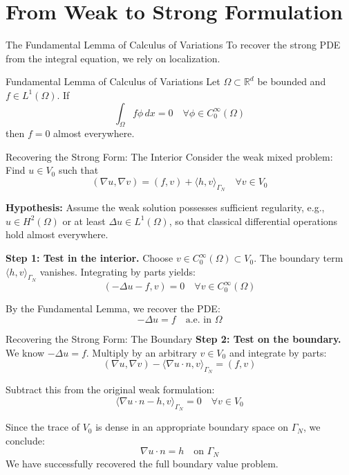 \documentclass[aspectratio=169]{beamer}
\begin{document}
\section{From Weak to Strong Formulation}

\begin{frame}{The Fundamental Lemma of Calculus of Variations}
    To recover the strong PDE from the integral equation, we rely on localization.

    \begin{block}{Fundamental Lemma of Calculus of Variations}
        Let $\Omega \subset \mathbb{R}^d$ be bounded and $f \in L^1(\Omega)$. If
        $$ \int_\Omega f \phi \, dx = 0 \quad \forall \phi \in C_0^\infty(\Omega) $$
        then $f = 0$ almost everywhere.
    \end{block}
\end{frame}

\begin{frame}{Recovering the Strong Form: The Interior}
    Consider the weak mixed problem: Find $u \in V_0$ such that
    $$ (\nabla u, \nabla v) = (f, v) + \langle h, v \rangle_{\Gamma_N} \quad \forall v \in V_0 $$

    \textbf{Hypothesis:} Assume the weak solution possesses sufficient regularity, e.g., $u \in H^2(\Omega)$ or at least $\Delta u \in L^1(\Omega)$, so that classical differential operations hold almost everywhere.

    \vspace{0.2cm}
    \textbf{Step 1: Test in the interior.}
    Choose $v \in C_0^\infty(\Omega) \subset V_0$. The boundary term $\langle h, v \rangle_{\Gamma_N}$ vanishes. Integrating by parts yields:
    $$ (-\Delta u - f, v) = 0 \quad \forall v \in C_0^\infty(\Omega) $$

    By the Fundamental Lemma, we recover the PDE:
    $$ -\Delta u = f \quad \text{a.e. in } \Omega $$
\end{frame}

\begin{frame}{Recovering the Strong Form: The Boundary}
    \textbf{Step 2: Test on the boundary.}
    We know $-\Delta u = f$. Multiply by an arbitrary $v \in V_0$ and integrate by parts:
    $$ (\nabla u, \nabla v) - \langle \nabla u \cdot n, v \rangle_{\Gamma_N} = (f, v) $$

    Subtract this from the original weak formulation:
    $$ \langle \nabla u \cdot n - h, v \rangle_{\Gamma_N} = 0 \quad \forall v \in V_0 $$

    Since the trace of $V_0$ is dense in an appropriate boundary space on $\Gamma_N$, we conclude:
    $$ \nabla u \cdot n = h \quad \text{on } \Gamma_N $$
    We have successfully recovered the full boundary value problem.
\end{frame}
\end{document}
